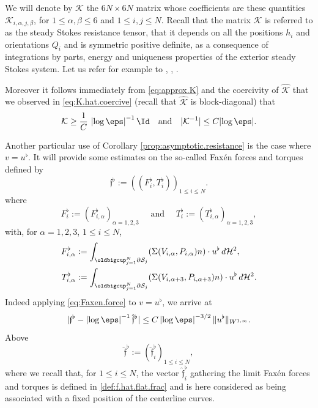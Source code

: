 We will denote by $\mathcal K$ the $6N \times 6N$ matrix whose coefficients are these quantities $\mathcal K_{i,\alpha,j,\beta}$, for $1 \leq \alpha,\beta \leq 6$ and $1 \leq i,j \leq N$.
Recall that the matrix $\mathcal K$ is referred to as the steady Stokes resistance tensor, that it depends on all the positions $h_i$ and orientations $Q_i$ and is symmetric positive definite, as a consequence of integrations by parts, energy and uniqueness properties of the exterior steady Stokes system. Let us refer for example to \cite[Chap.\,2]{Kim-Karilla}, \cite[Chap.\,5]{Galdi}, \cite[Chap.\,2 \& 3]{Lady}.

Moreover it follows immediately from \eqref{eq:approx.K} and the coercivity of $\hat{\mathcal K}$ that we observed in \eqref{eq:K.hat.coercive} (recall that $\hat{\mathcal K}$ is block-diagonal) that
\begin{equation}
\mathcal K \geq \frac1C\, \left|\log \eps\right|^{-1} \Id \quad \text{and} \quad | \mathcal K^{-1} |
\leq C {\left|\log \eps\right|}.
\label{eq:K.coercive}
\end{equation}

Another particular use of Corollary \ref{prop:asymptotic.resistance}
is the case where $v=u^\flat$.
It will provide some estimates on the so-called Faxén forces and torques defined by
\begin{equation}\label{clour}
\mathfrak{f}^\flat := ((F^\flat_{i},T^\flat_{i}))_{1 \leq i \leq N}.
\end{equation}
where
\begin{equation}
\label{fab3}
F^\flat_{i} := (F^\flat_{i,\alpha})_{\alpha=1,2,3} \quad \text{ and } \quad T^\flat_{i} := (T^\flat_{i,\alpha})_{\alpha=1,2,3},
\end{equation}
with, for $\alpha=1,2,3$, $1\leq i \leq N$,
\begin{align}
\label{fab1}
F^\flat_{i,\alpha} &:=
\int_{\oldbigcup_{j=1}^N \partial \mathcal S_j } (\Sigma (V_{i,\alpha}, P_{i,\alpha}) n) \cdot u^\flat \, d\mathcal{H}^2,
\\ \label{fab2}
T^\flat_{i,\alpha} &:=
\int_{\oldbigcup_{j=1}^N \partial \mathcal S_j } (\Sigma (V_{i, \alpha +3 }, P_{i, \alpha+3}) n) \cdot u^\flat \, d\mathcal{H}^2.
\end{align}
Indeed
applying \eqref{eq:Faxen.force} to $v=u^\flat$, we arrive at
\begin{equation} \label{ofint}
| \mathfrak{f}^\flat -\left|\log \eps\right|^{-1} \hat{\mathfrak f}^\flat|
\leq C \left|\log \eps\right|^{-3/2} \|u^\flat\|_{W^{1,\infty}}.
\end{equation}
Above
\[
{\hat{\mathfrak{f}}^\flat }
:= (\hat{\mathfrak{f}}_i^\flat)_{1 \leq i \leq N}, \]
where we recall that, for $1 \leq i \leq N$, the vector $\hat{\mathfrak{f}}^\flat_{i} $ gathering the limit Faxén forces and torques is defined in \eqref{def:f.hat.flat.frac} and is here considered as {being} associated with a fixed position of the centerline curves.

